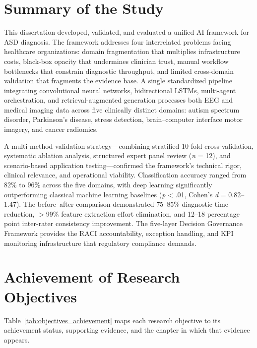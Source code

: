 \section{Summary of the Study}
\label{sec:study_summary}

This dissertation developed, validated, and evaluated a unified AI framework for ASD diagnosis. The framework addresses four interrelated problems facing healthcare organizations: domain fragmentation that multiplies infrastructure costs, black-box opacity that undermines clinician trust, manual workflow bottlenecks that constrain diagnostic throughput, and limited cross-domain validation that fragments the evidence base. A single standardized pipeline integrating convolutional neural networks, bidirectional LSTMs, multi-agent orchestration, and retrieval-augmented generation processes both EEG and medical imaging data across five clinically distinct domains: autism spectrum disorder, Parkinson's disease, stress detection, brain--computer interface motor imagery, and cancer radiomics.

A multi-method validation strategy---combining stratified 10-fold cross-validation, systematic ablation analysis, structured expert panel review (\textit{n} = 12), and scenario-based application testing---confirmed the framework's technical rigor, clinical relevance, and operational viability. Classification accuracy ranged from 82\% to 96\% across the five domains, with deep learning significantly outperforming classical machine learning baselines (\textit{p} < .01, Cohen's \textit{d} = 0.82--1.47). The before--after comparison demonstrated 75--85\% diagnostic time reduction, $>$99\% feature extraction effort elimination, and 12--18 percentage point inter-rater consistency improvement. The five-layer Decision Governance Framework provides the RACI accountability, exception handling, and KPI monitoring infrastructure that regulatory compliance demands.


\section{Achievement of Research Objectives}
\label{sec:objectives_achievement}

Table~\ref{tab:objectives_achievement} maps each research objective to its achievement status, supporting evidence, and the chapter in which that evidence appears.

